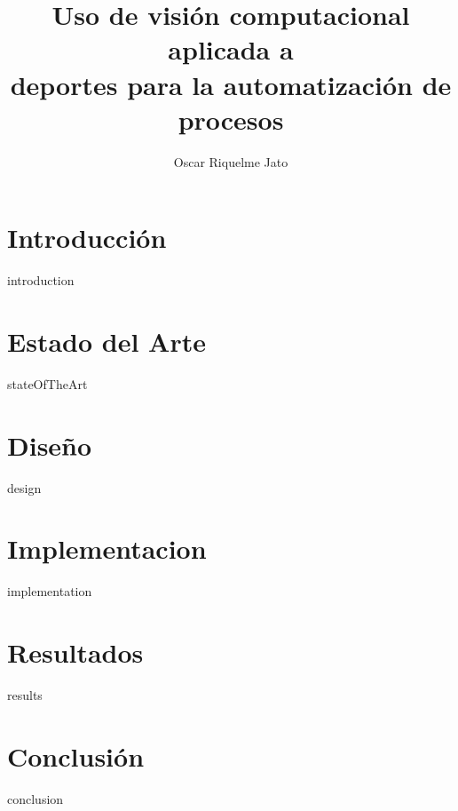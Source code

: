 \documentclass[epsbased,final,covers]{tfgtfmthesisuam}
\title[Visión computacional aplicada al deporte]{Uso de visión computacional aplicada a \\deportes para la automatización de procesos}
\author{Oscar Riquelme Jato}
\begin{document}

\chapter[Introducción]{Introducción}{introduction}
\chapter[Estado del Arte]{Estado del Arte}{stateOfTheArt}
\chapter[Diseño]{Diseño}{design}
\chapter[Implementación]{Implementacion}{implementation}
\chapter[Resultados]{Resultados}{results}
\chapter[Conclusión]{Conclusión}{conclusion}

\end{document}

